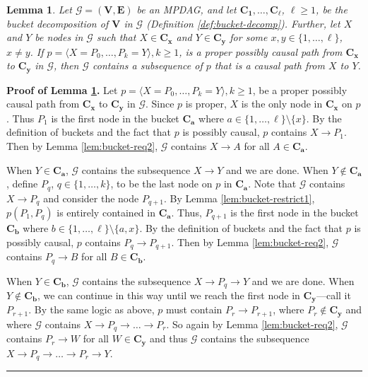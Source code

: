 \documentclass[11pt]{article}
\newcommand{\BlackBox}{\rule{1.5ex}{1.5ex}}  %
\newtheorem{lemma}[theorem]{Lemma}
\newcommand{\mb}[1]{\mathbf{#1}}
\newcommand{\g}[1][G]{\mathcal{#1}}
\newenvironment{proofof}[1][]{\noindent \textbf{Proof of #1.}}{\hfill\BlackBox}
\begin{document}
\begin{lemma} 
\label{lem:bucket-req3}
    Let $\g=(\mb{V},\mb{E})$ be an MPDAG, and let $\mb{C_1}, \dots, \mb{C_{\ell}}$, $\ell \ge 1$, be the bucket decomposition of $\mb{V}$ in $\g$ (Definition \ref{def:bucket-decomp}). Further, let $X$ and $Y$ be nodes in $\g$ such that $X \in \mb{C_x}$ and $Y \in \mb{C_y}$ for some $x,y \in \{1, \dots, \ell\}$, $x \neq y$. If $p = \langle X=P_0, \dots, P_k=Y\rangle, k \ge 1$, is a proper possibly causal path from $\mb{C_x}$ to $\mb{C_y}$ in $\g$, then $\g$ contains a subsequence of $p$ that is a causal path from $X$ to $Y$.
\end{lemma}

\begin{proofof}[Lemma \ref{lem:bucket-req3}]
    Let $p = \langle X=P_0, \dots, P_k=Y\rangle, k \ge 1$, be a proper possibly causal path from $\mb{C_x}$ to $\mb{C_y}$ in $\g$. Since $p$ is proper, $X$ is the only node in $\mb{C_x}$ on $p$. Thus $P_1$ is the first node in the bucket $\mb{C_a}$ where $a \in \{1, \dots, \ell \} \setminus \{x\}$. By the definition of buckets and the fact that $p$ is possibly causal, $p$ contains $X \to P_1$. Then by Lemma \ref{lem:bucket-req2}, $\g$ contains $X \to A$ for all $A \in \mb{C_a}$.

    When $Y \in \mb{C_a}$, $\g$ contains the subsequence $X \to Y$ and we are done. When $Y \notin \mb{C_a}$, define $P_q$, $q \in \{1, \dots, k \}$, to be the last node on $p$ in $\mb{C_a}$. Note that $\g$ contains $X \to P_q$ and consider the node $P_{q+1}$. By Lemma \ref{lem:bucket-restrict1}, $p(P_1, P_q)$ is entirely contained in $\mb{C_a}$. Thus, $P_{q+1}$ is the first node in the bucket $\mb{C_b}$ where $b \in \{1, \dots, \ell\} \setminus \{a, x\}$. By the definition of buckets and the fact that $p$ is possibly causal, $p$ contains $P_q \to P_{q+1}$. Then by Lemma \ref{lem:bucket-req2}, $\g$ contains $P_q \to B$ for all $B \in \mb{C_b}$.

    When $Y \in \mb{C_b}$, $\g$ contains the subsequence $X \to P_q \to Y$ and we are done. When $Y \notin \mb{C_b}$, we can continue in this way until we reach the first node in $\mb{C_y}$---call it $P_{r+1}$. By the same logic as above, $p$ must contain $P_r \to P_{r+1}$, where $P_r \notin \mb{C_y}$ and where $\g$ contains $X \to P_q \to \dots \to P_r$. So again by Lemma \ref{lem:bucket-req2}, $\g$ contains $P_r \to W$ for all $W \in \mb{C_y}$ and thus $\g$ contains the subsequence $X \to P_q \to \dots \to P_r \to Y$. 
\end{proofof}
\end{document}
